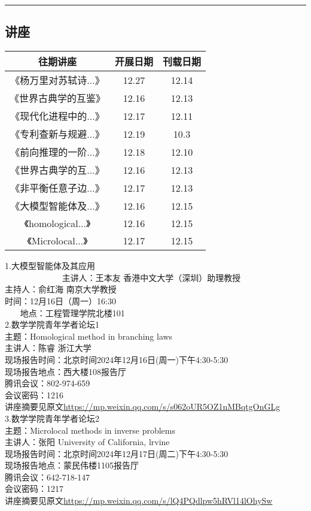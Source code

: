 \documentclass[letterpaper, 12pt]{article}
\begin{document}
\hrule
\pagebreak
\begin{multicols}{2}

\section{讲座}
\begin{tabular}{|c|c|c|}
    \hline
    往期讲座 & 开展日期 & 刊载日期\\
    \hline\hline
《杨万里对苏轼诗...》 & 12.27 & 12.14\\
《世界古典学的互鉴》 & 12.16 & 12.13\\
《现代化进程中的...》 & 12.17 & 12.11\\
《专利查新与规避...》 & 12.19 & 10.3\\
《前向推理的一阶...》 & 12.18 & 12.10\\
《世界古典学的互...》 & 12.16 & 12.13\\
《非平衡任意子边...》 & 12.17 & 12.13\\
《大模型智能体及...》 & 12.16 & 12.15\\
《homological...》 & 12.16 & 12.15\\
《Microlocal...》 & 12.17 & 12.15\\
    \hline
\end{tabular}

1.大模型智能体及其应用\\             
主讲人：王本友 香港中文大学（深圳）助理教授\\
主持人：俞红海 南京大学教授\\
时间：12月16日（周一）16:30\\   
地点：工程管理学院北楼101\\

2.数学学院青年学者论坛1\\
主题：Homological method in branching laws\\
主讲人：陈睿 浙江大学\\
现场报告时间：北京时间2024年12月16日(周一)下午4:30-5:30\\
现场报告地点：西大楼108报告厅\\
腾讯会议：802-974-659\\
会议密码：1216\\
讲座摘要见原文\url{https://mp.weixin.qq.com/s/s062oUR5OZ1nMBqtgOnGLg}\\

3.数学学院青年学者论坛2\\
主题：Microlocal methods in inverse problems\\
主讲人：张阳 University of California, lrvine\\
现场报告时间：北京时间2024年12月17日(周二)下午4:30-5:30\\
现场报告地点：蒙民伟楼1105报告厅\\
腾讯会议：642-718-147\\
会议密码：1217\\
讲座摘要见原文\url{https://mp.weixin.qq.com/s/lQ4PQdlpw5hRVl14lOhySw}\\



\end{multicols}
\end{document}
